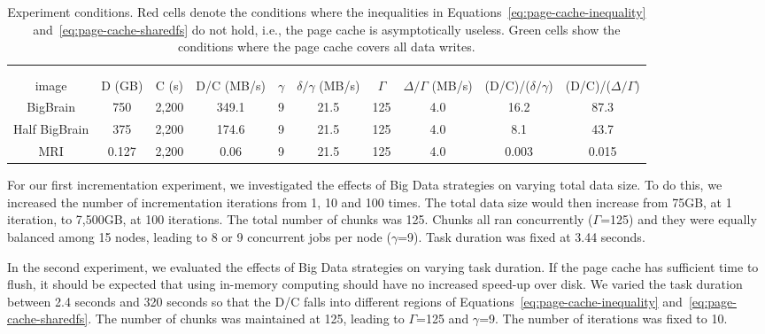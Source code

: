\documentclass{IEEEtran}
\begin{document}
\begin{table*}
\begin{tabular}{c|ccc|cccc|cc}
\hline
  \multicolumn{10}{c}{}\\ 
 \rowcolor{headcolor}
  \multicolumn{10}{c}{Experiment 4: Image Size}\\
  \hline
  \rowcolor{headcolor}
 image  &
 D (GB) & C (s) & D/C (MB/s) &
 $\gamma$ & $\delta/\gamma$ (MB/s) & $\Gamma$ & $\Delta/\Gamma$ (MB/s)&
(D/C)/($\delta/\gamma$) & (D/C)/($\Delta/\Gamma$)\\
 \hline
 BigBrain      & 750   & 2,200   & 349.1     & 9  & 21.5  & 125 & 4.0 &  \cellcolor{red!20} 16.2 & \cellcolor{red!20} 87.3   \\
 Half BigBrain & 375   & 2,200   & 174.6     & 9  & 21.5  & 125 & 4.0 &  \cellcolor{red!20} 8.1 & \cellcolor{red!20} 43.7   \\
 MRI           & 0.127 & 2,200   & 0.06      & 9  & 21.5  & 125 & 4.0 &  \cellcolor{green!20} 0.003 & \cellcolor{green!20} 0.015  
\end{tabular}
\caption{Experiment conditions. Red cells denote the conditions where 
the inequalities in Equations~\ref{eq:page-cache-inequality} 
and~\ref{eq:page-cache-sharedfs} do not hold, i.e., the page cache is 
asymptotically useless. Green cells show the conditions where the page cache covers all data writes.}
\label{table:experiments}
\end{table*}

For our first incrementation experiment, we investigated the effects of 
Big Data strategies on varying total data size. To do this, we 
increased the number of incrementation iterations from 1, 10 and 100 
times. The total data size would then increase from 75GB, at 1 
iteration, to 7,500GB, at 100 iterations. The total number of chunks 
was 125. Chunks all ran concurrently ($\Gamma$=125) and they were 
equally balanced among 15 nodes, leading to 8 or 9 concurrent jobs per 
node ($\gamma$=9). Task duration was fixed at 3.44 seconds.

In the second experiment, we evaluated the effects of Big Data 
strategies on varying task duration. If the page cache has sufficient 
time to flush, it should be expected that using in-memory computing 
should have no increased speed-up over disk. We varied the task 
duration between 2.4 seconds and 320 seconds so that the D/C falls into 
different regions of Equations~\ref{eq:page-cache-inequality} 
and~\ref{eq:page-cache-sharedfs}. The number of chunks was maintained 
at 125, leading to $\Gamma$=125 and $\gamma$=9. The number of iterations was
fixed to 10.
\end{document}
